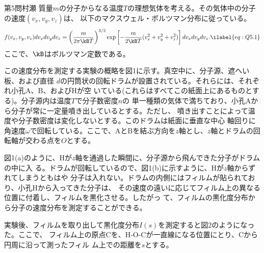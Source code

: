 \begin{question}{第5問}{村瀬}
質量$m$の分子からなる温度$T$の理想気体を考える。その気体中の分子の速度$(v_x,v_y,v_z)$は、
以下のマクスウェル・ボルツマン分布に従っている。
\begin{align}
  f(v_x,v_y,v_z) dv_x dv_y dv_z
  = \left(\frac{m}{2\pi\kB T}\right)^{3/2}
    \exp\left[-\frac{m}{2\kB T}(v_x^2+v_y^2+v_z^2)\right]
    dv_x dv_y dv_z. \ilabel{eq:Q5.1}
\end{align}
ここで、$\kB$はボルツマン定数である。

この速度分布を測定する実験の概略を図1に示す。真空中に、分子源、遮へい板、および直径
$d$の円筒状の回転ドラムが設置されている。それらには、それぞれ小孔A、B、およびHが空
いている(これらはすべてこの紙面上にあるものとする)。分子源内は温度$T$で分子数密度$n$の
単一種類の気体で満ちており、小孔Aから分子が常に一定量噴き出しているとする。ただし、
噴き出すことによって温度や分子数密度は変化しないとする。このドラムは紙面に垂直な中心
軸回りに角速度$\omega$で回転している。ここで、AとBを結ぶ方向を$z$軸とし、$z$軸とドラムの回
転軸が交わる点を$O$とする。

図1(a)のように、Hが$z$軸を通過した瞬間に、分子源から飛んできた分子がドラムの中に入
る。ドラムが回転しているので、図1(b)に示すように、Hが$z$軸からずれてしまうともはや
分子は入れない。ドラムの内側にはフィルムが貼られており、小孔Hから入ってきた分子は、
その速度の遠いに応じてフィルム上の異なる位置に付着し、フィルムを黒化させる。したがっ
て、フィルムの黒化度分布から分子の速度分布を測定することができる。

実験後、フィルムを取り出して黒化度分布$I(s)$を測定すると図2のようになった。ここで、
フィルム上の原点Cを、H-O-Cが一直線になる位置にとり、Cから円周に沿って測ったフィル
ム上での距離を$s$とする。


\end{question}
